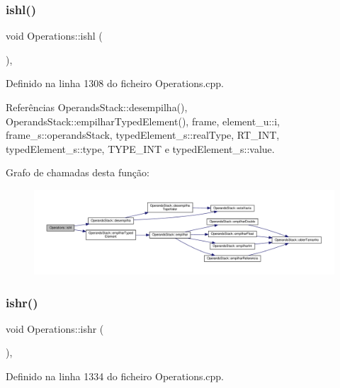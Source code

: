 \subsubsection{\texorpdfstring{ishl()}{ishl()}}
{\footnotesize\ttfamily void Operations\+::ishl (\begin{DoxyParamCaption}{ }\end{DoxyParamCaption})\hspace{0.3cm}{\ttfamily [static]}, {\ttfamily [private]}}



Definido na linha 1308 do ficheiro Operations.\+cpp.



Referências Operands\+Stack\+::desempilha(), Operands\+Stack\+::empilhar\+Typed\+Element(), frame, element\+\_\+u\+::i, frame\+\_\+s\+::operands\+Stack, typed\+Element\+\_\+s\+::real\+Type, R\+T\+\_\+\+I\+NT, typed\+Element\+\_\+s\+::type, T\+Y\+P\+E\+\_\+\+I\+NT e typed\+Element\+\_\+s\+::value.

Grafo de chamadas desta função\+:
\nopagebreak
\begin{figure}[H]
\begin{center}
\leavevmode
\includegraphics[width=350pt]{classOperations_a3139bbe41519fb4761ecd7e2a8ddb994_cgraph}
\end{center}
\end{figure}
\mbox{\label{classOperations_aa67d92582121939b307658d417b34d3c}} 
\subsubsection{\texorpdfstring{ishr()}{ishr()}}
{\footnotesize\ttfamily void Operations\+::ishr (\begin{DoxyParamCaption}{ }\end{DoxyParamCaption})\hspace{0.3cm}{\ttfamily [static]}, {\ttfamily [private]}}



Definido na linha 1334 do ficheiro Operations.\+cpp.



